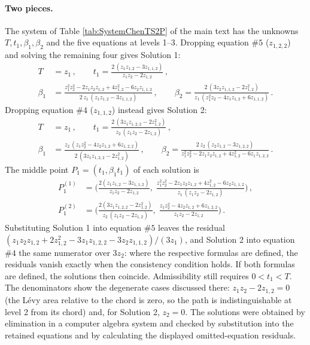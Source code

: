 \documentclass[11pt,english]{article}
\theoremstyle{definition}
\theoremstyle{remark}
\begin{document}
\paragraph{Two pieces.}
The system of Table \ref{tab:SystemChenTS2P} of the main text has the unknowns
$T,t_{1},\beta_{1},\beta_{2}$ and the five equations at levels 1--3.
Dropping equation $\#5$ ($z_{1,2,2}$) and solving the remaining four
gives Solution 1:
\begin{align}
T & =z_{1}\,,\qquad t_{1}=\frac{2\,(z_{1}z_{1,2}-3z_{1,1,2})}{z_{1}z_{2}-2z_{1,2}}\,,\nonumber\\
\beta_{1} & =\frac{z_{1}^{2}z_{2}^{2}-2z_{1}z_{2}z_{1,2}+4z_{1,2}^{2}-6z_{2}z_{1,1,2}}{2\,z_{1}\,(z_{1}z_{1,2}-3z_{1,1,2})}\,,\qquad
\beta_{2}=\frac{2\,(3z_{2}z_{1,1,2}-2z_{1,2}^{2})}{z_{1}\,(z_{1}^{2}z_{2}-4z_{1}z_{1,2}+6z_{1,1,2})}\,.\label{eq:TwoPieceSol1}
\end{align}
Dropping equation $\#4$ ($z_{1,1,2}$) instead gives Solution 2:
\begin{align}
T & =z_{1}\,,\qquad t_{1}=\frac{2\,(3z_{1}z_{1,2,2}-2z_{1,2}^{2})}{z_{2}\,(z_{1}z_{2}-2z_{1,2})}\,,\nonumber\\
\beta_{1} & =\frac{z_{2}\,(z_{1}z_{2}^{2}-4z_{2}z_{1,2}+6z_{1,2,2})}{2\,(3z_{1}z_{1,2,2}-2z_{1,2}^{2})}\,,\qquad
\beta_{2}=\frac{2\,z_{2}\,(z_{2}z_{1,2}-3z_{1,2,2})}{z_{1}^{2}z_{2}^{2}-2z_{1}z_{2}z_{1,2}+4z_{1,2}^{2}-6z_{1}z_{1,2,2}}\,.\label{eq:TwoPieceSol2}
\end{align}
The middle point $P_{1}=(t_{1},\beta_{1}t_{1})$ of each solution is
\begin{align}
P_{1}^{(1)} & =\biggl(\frac{2(z_{1}z_{1,2}-3z_{1,1,2})}{z_{1}z_{2}-2z_{1,2}},\;\frac{z_{1}^{2}z_{2}^{2}-2z_{1}z_{2}z_{1,2}+4z_{1,2}^{2}-6z_{2}z_{1,1,2}}{z_{1}\,(z_{1}z_{2}-2z_{1,2})}\biggr)\,,\\
P_{1}^{(2)} & =\biggl(\frac{2(3z_{1}z_{1,2,2}-2z_{1,2}^{2})}{z_{2}\,(z_{1}z_{2}-2z_{1,2})},\;\frac{z_{1}z_{2}^{2}-4z_{2}z_{1,2}+6z_{1,2,2}}{z_{1}z_{2}-2z_{1,2}}\biggr)\,.
\end{align}
Substituting Solution 1 into equation $\#5$ leaves the residual
$(z_{1}z_{2}z_{1,2}+2z_{1,2}^{2}-3z_{1}z_{1,2,2}-3z_{2}z_{1,1,2})/(3z_{1})$,
and Solution 2 into equation $\#4$ the same numerator over $3z_{2}$:
where the respective formulas are defined, the residuals vanish exactly
when the consistency condition holds. If both formulas are defined,
the solutions then coincide. Admissibility still requires $0<t_1<T$. The
denominators show the degenerate cases discussed there: $z_{1}z_{2}-2z_{1,2}=0$
(the Lévy area relative to the chord is zero, so the path is
indistinguishable at level 2 from its chord) and, for Solution 2,
$z_{2}=0$. The solutions were obtained by elimination in a computer
algebra system and checked by substitution into the retained equations and by calculating
the displayed omitted-equation residuals.
\end{document}
